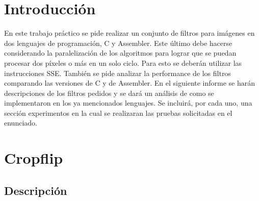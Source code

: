 ﻿\documentclass[a4paper]{article}
\begin{document}
\thispagestyle{empty}
\maketitle
\newpage


\thispagestyle{empty}
\vspace{3cm}
\tableofcontents
\newpage





\section{Introducci\'on}

	En este trabajo pr\'actico se pide realizar un conjunto de filtros para imágenes en dos lenguajes de programaci\'on, C y Assembler. Este \'ultimo debe hacerse considerando la paralelizaci\'on de los algoritmos para lograr que se puedan procesar dos píxeles o m\'as en un solo ciclo. Para esto se deberán utilizar las instrucciones SSE. Tambi\'en se pide analizar la performance de los filtros comparando las versiones de C y de Assembler. En el siguiente informe se harán descripciones de los filtros pedidos y se dará un análisis de como se implementaron en los ya mencionados lenguajes. Se incluirá, por cada uno, una secci\'on experimentos en la cual se realizaran las pruebas solicitadas en el enunciado. 
	
	
\section{Cropflip}
	
\subsection{Descripci\'on}
\end{document}
